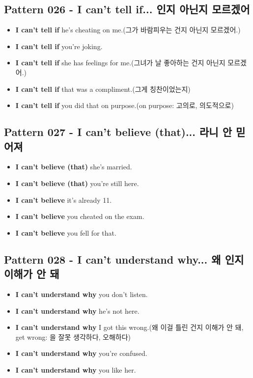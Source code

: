 \documentclass[11pt]{oblivoir}
\begin{document}
\subsection{Pattern 026 - I can't tell if... \texttildelow 인지 아닌지 모르겠어}
\begin{itemize}
  \item \textbf{I can't tell if} he's cheating on me.(그가 바람피우는 건지 아닌지 모르겠어.)
  \item \textbf{I can't tell if} you're joking.
  \item \textbf{I can't tell if} she has feelings for me.(그녀가 날 좋아하는 건지 아닌지 모르겠어.)
  \item \textbf{I can't tell if} that was a compliment.(그게 칭찬이었는지)
  \item \textbf{I can't tell if} you did that on purpose.(on purpose: 고의로, 의도적으로)
\end{itemize}

\subsection{Pattern 027 - I can't believe (that)... \texttildelow 라니 안 믿어져}
\begin{itemize}
  \item \textbf{I can't believe (that)} she's married.
  \item \textbf{I can't believe (that)} you're still here.
  \item \textbf{I can't believe} it's already 11.
  \item \textbf{I can't believe} you cheated on the exam.
  \item \textbf{I can't believe} you fell for that.
\end{itemize}

\subsection{Pattern 028 - I can't understand why... 왜 \texttildelow 인지 이해가 안 돼}
\begin{itemize}
  \item \textbf{I can't understand why} you don't listen.
  \item \textbf{I can't understand why} he's not here.
  \item \textbf{I can't understand why} I got this wrong.(왜 이걸 틀린 건지 이해가 안 돼, get \texttildelow wrong: \texttildelow 을 잘못 생각하다, 오해하다)
  \item \textbf{I can't understand why} you're confused.
  \item \textbf{I can't understand why} you like her.
\end{itemize}
\end{document}
